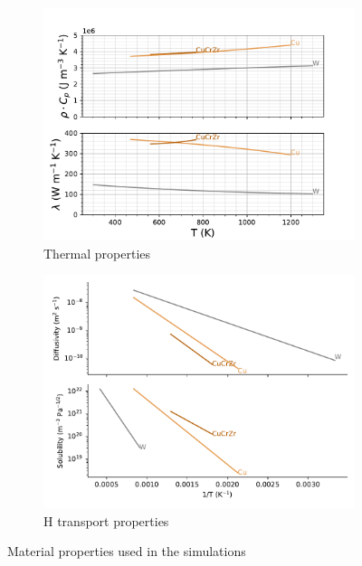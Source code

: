 \begin{figure}
    \centering
    \begin{subfigure}{\linewidth}
        \centering
        \includegraphics[width=\linewidth]{Figures/Chapter3/monoblocks/interface_condition/iter case/thermal_prop.pdf}
        \caption{Thermal properties}
    \end{subfigure}
    \begin{subfigure}{\linewidth}
        \centering
        \includegraphics[width=\linewidth]{Figures/Chapter3/monoblocks/monoblock_H_transport_properties.pdf}
        \caption{H transport properties}
    \end{subfigure}
    \caption{Material properties used in the simulations \cite{frauenfelder_solution_1969, reiter_compilation_1996, serra_hydrogen_1998, aiello_hydrogen_2002}}
\end{figure}

